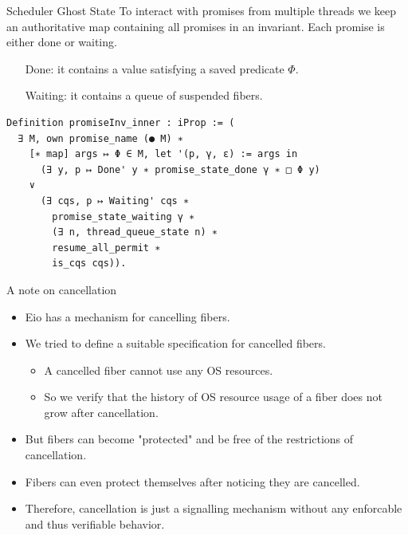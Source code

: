 \documentclass[aspectratio=43]{beamer}
\begin{document}
\begin{frame}[fragile]{Scheduler Ghost State}
    To interact with promises from multiple threads we keep an authoritative map containing all promises in an invariant.
    Each promise is either done or waiting.
    \begin{itemize}
        \item[Done:] it contains a value satisfying a saved predicate \(\Phi\).
        \item[Waiting:] it contains a queue of suspended fibers.
    \end{itemize}
    \begin{verbatim}
Definition promiseInv_inner : iProp := (
  ∃ M, own promise_name (● M) ∗ 
    [∗ map] args ↦ Φ ∈ M, let '(p, γ, ε) := args in
      (∃ y, p ↦ Done' y ∗ promise_state_done γ ∗ □ Φ y)
    ∨
      (∃ cqs, p ↦ Waiting' cqs ∗
        promise_state_waiting γ ∗
        (∃ n, thread_queue_state n) ∗
        resume_all_permit ∗
        is_cqs cqs)).
    \end{verbatim}
\end{frame}

\begin{frame}{A note on cancellation}
    \begin{itemize}
        \item Eio has a mechanism for cancelling fibers.
        \item We tried to define a suitable specification for cancelled fibers.
              \begin{itemize}
                  \item A cancelled fiber cannot use any OS resources.
                  \item So we verify that the history of OS resource usage of a fiber does not grow after cancellation.
              \end{itemize}
        \item But fibers can become "protected" and be free of the restrictions of cancellation.
        \item Fibers can even protect themselves after noticing they are cancelled.
        \item Therefore, cancellation is just a signalling mechanism without any enforcable and thus verifiable behavior.
    \end{itemize}
\end{frame}
\end{document}
